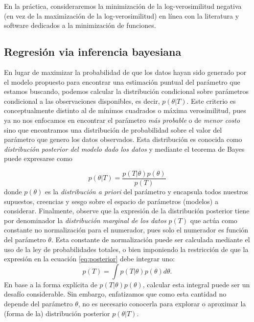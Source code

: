 En la práctica, consideraremos la minimización de la log-verosimilitud negativa (en vez de la maximización de la log-verosimilitud) en línea con la literatura y software dedicados a la minimización de funciones. 

\subsection{Regresión via inferencia bayesiana} %
\label{sub:inferencia_bayes}

En lugar de maximizar la probabilidad de que los datos hayan sido generado por el modelo propuesto para encontrar una estimación puntual del parámetro que estamos buscando, podemos calcular la distribución condicional sobre parámetros condicional a las observaciones disponibles, es decir, $p(\theta|T)$. Este criterio es conceptualmente distinto al de mínimos cuadrados o máxima verosimilitud, pues ya no nos enfocamos en encontrar el parámetro \emph{más probable} o de \emph{menor costo} sino que encontramos una distribución de probabilidad sobre el valor del parámetro que genero los datos observados. Esta distribución es conocida como \emph{distribución posterior del modelo dado los datos} y mediante el teorema de Bayes puede expresarse como

\begin{equation}
	p(\theta|T)=\frac{p(T|\theta)p(\theta)}{p(T)}
	\label{eq:posterior}
\end{equation}
donde $p(\theta)$ es la \emph{distribución a priori} del parámetro y encapsula todos nuestros supuestos, creencias y sesgo sobre el espacio de parámetros (modelos) a considerar. Finalmente, observe que la expresión de la distribución posterior tiene por denominador la \emph{distribución marginal de los datos} $p(T)$ que actúa como constante no normalización para el numerador, pues solo el numerador es función del parámetro $\theta$. Esta constante de normalización puede ser calculada mediante el uso de la ley de probabilidades totales, o bien imponiendo la restricción de que la expresión en la ecuación \eqref{eq:posterior} debe integrar uno:
\begin{equation}
	p(T) = \int p(T|\theta)p(\theta)d\theta.
\end{equation}
En base a la forma explícita de $p(T|\theta)p(\theta)$, calcular esta integral puede ser un desafío considerable. Sin embargo, enfatizamos que como esta cantidad no depende del parámetro $\theta$, no es necesario conocerla para explorar o aproximar la (forma de la) distribución posterior $p(\theta|T)$. 

